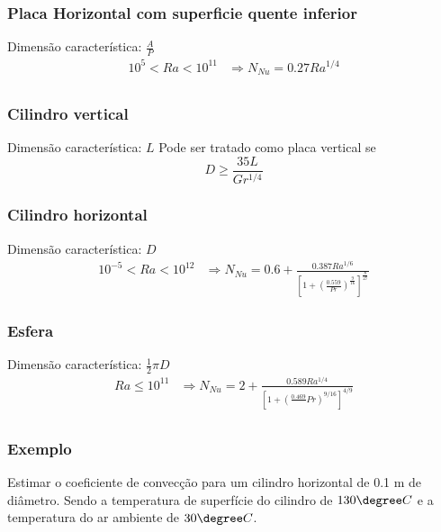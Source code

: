 \subsubsection{Placa Horizontal com superficie quente inferior}
Dimensão característica: \(\frac{A}{P}\)
\begin{align}
    10^5 < Ra < 10^{11 } &\Rightarrow N_{Nu} = 0.27 Ra^{1/4}\\
\end{align}
\subsubsection{Cilindro vertical}
Dimensão característica: \(L\)
Pode ser tratado como placa vertical se
\begin{equation}
    D \geq \frac{35L}{Gr^{1/4} }    
\end{equation}
\subsubsection{Cilindro horizontal}
Dimensão característica: \(D\)
\begin{align}
    10^{-5} < Ra < 10^{12} &\Rightarrow N_{Nu} =  0.6 + \frac{0.387 Ra^{1/6} }{\left[ 1 + \left( \frac{0.559}{Pr} \right)^{\frac{9}{16}}  \right]^{\frac{8}{27}} }
\end{align}
\subsubsection{Esfera}
Dimensão característica: \(\frac{1}{2}\pi  D\)
\begin{align}
    Ra \leq 10^{11} &\Rightarrow N_{Nu} = 2 + \frac{0.589 Ra^{1/4} }{\left[ 1 + \left( \frac{0.469}{}Pr \right)^{9/16}  \right]^{4/9} }\\
\end{align}
\subsubsection{Exemplo}
Estimar o coeficiente de convecção para um cilindro horizontal de 0.1 m de diâmetro. Sendo a
temperatura de superfície do cilindro de \(130 \degree C\) e a temperatura do ar ambiente de
\(30\degree C\).   
